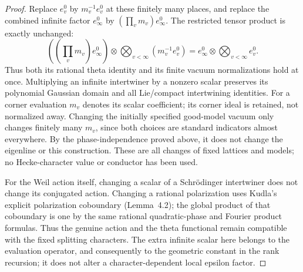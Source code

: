 \begin{proof}
Replace \(e_v^0\) by \(m_v^{-1}e_v^0\) at these finitely many
places, and replace the combined infinite factor \(e_\infty^0\)
by \((\prod_v m_v)e_\infty^0\).
The restricted tensor product is exactly unchanged:
\[
 \left((\prod_v m_v)e_\infty^0\right)
       \otimes\bigotimes_{v<\infty}(m_v^{-1}e_v^0)
             =e_\infty^0\otimes\bigotimes_{v<\infty}e_v^0.
\]
Thus both its rational theta identity and its finite vacuum
normalizations hold at once. Multiplying an infinite
intertwiner by a nonzero scalar preserves its polynomial
Gaussian domain and all Lie/compact intertwining identities.
For a corner evaluation \(m_v\) denotes its scalar coefficient;
its corner ideal is retained, not normalized away.
Changing the initially specified good-model vacuum only changes
finitely many \(m_v\), since both choices are standard indicators
almost everywhere. By the phase-independence proved above,
it does not change the eigenline or this construction.
These are all changes of fixed lattices and models; no
Hecke-character value or conductor has been used.

For the Weil action itself, changing a scalar of a Schr\"odinger
intertwiner does not change its conjugated action.
Changing a rational polarization uses Kudla's explicit
polarization coboundary (Lemma~4.2); the global product of that
coboundary is one by the same rational quadratic-phase and
Fourier product formulas. Thus the genuine action and the
theta functional remain compatible with the fixed splitting
characters. The extra infinite scalar here belongs to the
evaluation operator, and consequently to the geometric
constant in the rank recursion; it does not alter a
character-dependent local epsilon factor.
\end{proof}

